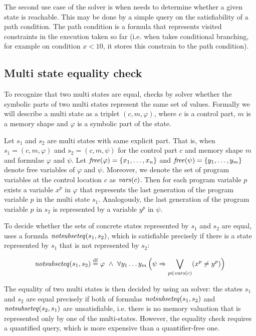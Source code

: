 The second use case of the \SMT solver is when \SymDIVINE needs to determine
whether a given state is reachable. This may be done by a simple query on the
satisfiability of a path condition. The path condition is a formula that
represents visited constraints in the execution taken so far (i.e.  when
\SymDIVINE takes conditional branching, for example on condition $x < 10$, it
stores this constrain to the path condition).

\subsection{Multi state equality check}\label{subsec:equality}

To recognize that two multi states are equal, \SymDIVINE checks by \SMT solver
whether the symbolic parts of two multi states represent the same set of values.
Formally we will describe a multi state as a triplet $(c, m, \varphi)$, where
$c$ is a control part, $m$ is a memory shape and $\varphi$ is a symbolic part of
the state.

Let $s_1$ and $s_2$ are multi states with same explicit part. That is, when $s_1
= (c, m, \varphi)$ and $s_2 = (c, m, \psi)$ for the control part $c$ and memory
shape $m$ and formulae $\varphi$ and $\psi$. Let $\mathit{free}(\varphi) = \{x_1, \dots,
x_n\}$ and $\mathit{free}(\psi) = \{ y_1, \dots, y_m\}$ denote free variables of
$\varphi$ and $\psi$. Moreover, we denote the set of program variables at the
control location $c$ as $\mathit{vars}(c)$. Then for each program variable $p$ exists a
variable $x^p$ in $\varphi$ that represents the last generation of the program
variable $p$ in the multi state $s_1$. Analogously, the last generation of the
program variable $p$ in $s_2$ is represented by a variable $y^p$ in $\psi$.

To decide whether the sets of concrete states represented by $s_1$ and $s_2$ are
equal, \SymDIVINE uses a formula $\mathit{notsubseteq}(s_1, s_2)$, which is satisfiable
precisely if there is a state represented by $s_1$ that is not represented by
$s_2$:

\[
  \mathit{notsubseteq}(s_1, s_2) \stackrel{\mathrm{df}}{=} \varphi~\land~ \forall y_1 \ldots y_m
  \, \Big ( \psi \Rightarrow \bigvee_{p \in \mathit{vars}(c)} (x^p \not =
  y^p) \Big)
\]

The equality of two multi states is then decided by using an \SMT solver: the
states $s_1$ and $s_2$ are equal precisely if both of formulas
$\mathit{notsubseteq}(s_1, s_2)$ and $\mathit{notsubseteq}(s_2, s_1)$ are unsatisfiable, i.e.
there is no memory valuation that is represented only by one of the
multi-states. However, the equality check requires a quantified \SMT query,
which is more expensive than a quantifier-free one.


